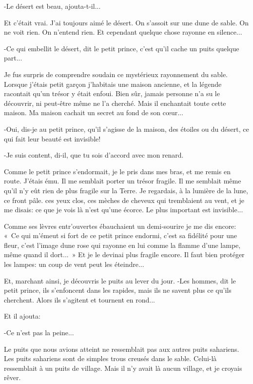 \documentclass{report}
\begin{document}
-Le désert est beau, ajouta-t-il...

Et c'était vrai. J'ai toujours aimé le désert. On s'assoit sur une dune de sable. On ne voit rien. On n'entend rien. Et cependant quelque chose rayonne en silence...

-Ce qui embellit le désert, dit le petit prince, c'est qu'il cache un puits quelque part...

Je fus surpris de comprendre soudain ce mystérieux rayonnement du sable. Lorsque j'étais petit garçon j'habitais une maison ancienne, et la légende racontait qu'un trésor y était enfoui. Bien sûr, jamais personne n'a su le découvrir, ni peut-être même ne l'a cherché. Mais il enchantait toute cette maison. Ma maison cachait un secret au fond de son cœur...

-Oui, dis-je au petit prince, qu'il s'agisse de la maison, des étoiles ou du désert, ce qui fait leur beauté est invisible!

-Je suis content, di-il, que tu sois d'accord avec mon renard.

Comme le petit prince s'endormait, je le pris dans mes bras, et me remis en route. J'étais ému. Il me semblait porter un trésor fragile. Il me semblait même qu'il n'y eût rien de plus fragile sur la Terre. Je regardais, à la lumière de la lune, ce front pâle. ces yeux clos, ces mèches de cheveux qui tremblaient au vent, et je me disais: ce que je vois là n'est qu'une écorce. Le plus important est invisible...

Comme ses lèvres entr'ouvertes ébauchaient un demi-sourire je me dis encore: «~Ce qui m'émeut si fort de ce petit prince endormi, c'est sa fidélité pour une fleur, c'est l'image dune rose qui rayonne en lui comme la flamme d'une lampe, même quand il dort...~» Et je le devinai plus fragile encore. Il faut bien protéger les lampes: un coup de vent peut les éteindre...

Et, marchant ainsi, je découvris le puits au lever du jour.
\parachapter{} %
-Les hommes, dit le petit prince, ils s'enfoncent dans les rapides, mais ils ne savent plus ce qu'ils cherchent. Alors ils s'agitent et tournent en rond...

Et il ajouta:

-Ce n'est pas la peine...

Le puits que nous avions atteint ne ressemblait pas aux autres puits sahariens. Les puits sahariens sont de simples trous creusés dans le sable. Celui-là ressemblait à un puits de village. Mais il n'y avait là aucun village, et je croyais rêver.
\end{document}

